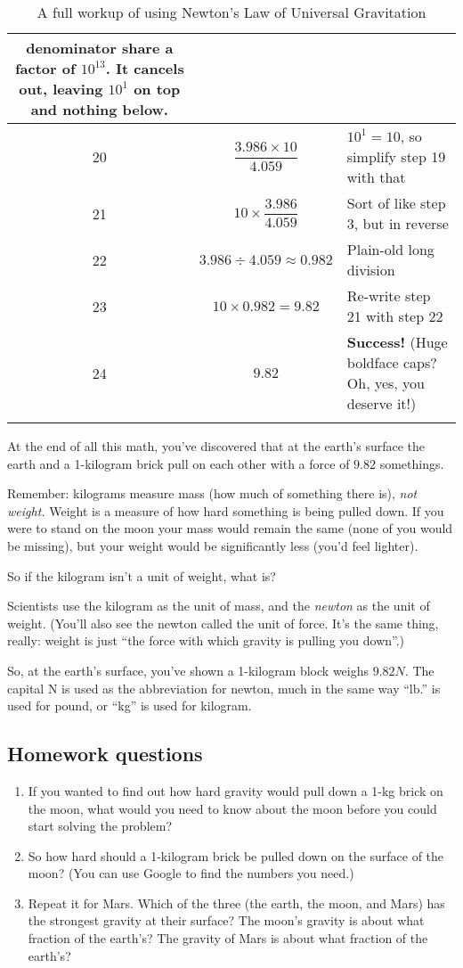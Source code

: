 \documentclass[12pt,letterpaper]{article}
\begin{document}
\begin{longtable}{| c | p{} | p{} |}
  denominator share a factor of $10^{13}$.  It cancels out, leaving
  $10^1$ on top and nothing below. \\
  \hline
  20 & \[\frac{3.986 \times 10}{4.059}\] & $10^1 = 10$, so simplify
  step 19 with that \\
  \hline
  21 & \[10 \times \frac{3.986}{4.059}\] & Sort of like step 3, but in
  reverse \\
  \hline
  22 & \[3.986 \div 4.059 \approx 0.982\] & Plain-old long division \\
  \hline
  23 & \[10 \times 0.982 = 9.82 \] & Re-write step 21 with step 22 \\
  \hline
  24 & \[9.82\] & {\Huge{\textbf{Success!}}} (Huge boldface caps?  Oh, yes,
  you deserve it!) \\
  \hline   
\caption{A full workup of using Newton's Law of Universal Gravitation}  
\end{longtable}

At the end of all this math, you've discovered that at the earth's
surface the earth and a 1-kilogram brick pull on each other with a
force of $9.82$ somethings.

Remember: kilograms measure mass (how much of something there is),
\textit{not weight.}  Weight is a measure of how hard something is
being pulled down.  If you were to stand on the moon your mass would
remain the same (none of you would be missing), but your weight would
be significantly less (you'd feel lighter).

So if the kilogram isn't a unit of weight, what is?

Scientists use the kilogram as the unit of mass, and the
\textit{newton} as the unit of weight.  (You'll also see the newton
called the unit of force.  It's the same thing, really: weight is just
``the force with which gravity is pulling you down''.)

So, at the earth's surface, you've shown a 1-kilogram block weighs
$9.82N$.  The capital N is used as the abbreviation for newton, much
in the same way ``lb.'' is used for pound, or ``kg'' is used for kilogram.

\subsection{Homework questions}
\begin{enumerate}
\item
If you wanted to find out how hard gravity would pull down a 1-kg brick on
the moon, what would you need to know about the moon before you could start
solving the problem?
\item
So how hard should a 1-kilogram brick be pulled down on the surface of
the moon?  (You can use Google to find the numbers you need.)
\item
Repeat it for Mars.  Which of the three (the earth, the moon, and Mars) has the
strongest gravity at their surface?  The moon's gravity is about what
fraction of the earth's?  The gravity of Mars is about what fraction of
the earth's?
\end{enumerate}
\end{document}
